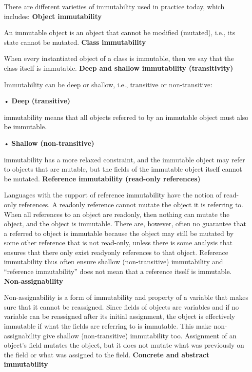 \documentclass[conference]{IEEEtran}
\begin{document}
There are different varieties of immutability used in practice today, which includes:\newline
\textbf{Object immutability}

An immutable object is an object that cannot be modified (mutated), i.e., its state cannot be mutated.\newline
\textbf{Class immutability}

When every instantiated object of a class is immutable, then we say that the class itself is immutable.\newline
\textbf{Deep and shallow immutability (transitivity)}

 Immutability can be deep or shallow, i.e., transitive or non-transitive:

 • \textbf{Deep (transitive)}

immutability means that all objects referred to by an immutable object must also be immutable.

• \textbf{Shallow (non-transitive)}

immutability has a more relaxed constraint, and the immutable object may refer to objects that are mutable, but the fields of the immutable object itself cannot be mutated.\newline
\textbf{Reference immutability (read-only references)}

Languages with the support of reference immutability have the notion of read-only references. A readonly
reference cannot mutate the object it is referring to. When all references to an object are readonly,
then nothing can mutate the object, and the object is immutable. There are, however, often no
guarantee that a referred to object is immutable because the object may still be mutated by some other
reference that is not read-only, unless there is some analysis that ensures that there only exist readyonly
references to that object. Reference immutability thus often ensure shallow (non-transitive)
immutability and “reference immutability” does not mean that a reference itself is immutable.\newline
\textbf{Non-assignability}

Non-assignability is a form of immutability and property of a variable that makes sure that it cannot
be reassigned. Since fields of objects are variables and if no variable can be reassigned after its initial
assignment, the object is effectively immutable if what the fields are referring to is immutable. This
make non-assignability give shallow (non-transitive) immutability too. Assignment of an object’s field
mutates the object, but it does not mutate what was previously on the field or what was assigned to the
field.\newline
\textbf{Concrete and abstract immutability}
\end{document}
